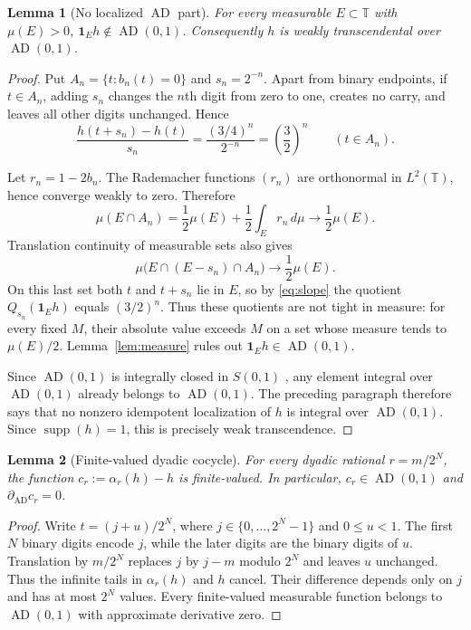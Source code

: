 \documentclass[11pt]{article}
\newtheorem{lemma}{Lemma}
\newcommand{\AD}{\operatorname{AD}}
\newcommand{\supp}{\operatorname{supp}}
\newcommand{\T}{\mathbb T}
\newcommand{\1}{\mathbf 1}
\begin{document}
\begin{lemma}[No localized $\AD$ part]\label{lem:weak}
For every measurable $E\subset\T$ with $\mu(E)>0$,
$\1_Eh\notin\AD(0,1)$.  Consequently $h$ is weakly transcendental over
$\AD(0,1)$.
\end{lemma}

\begin{proof}
Put $A_n=\{t:b_n(t)=0\}$ and $s_n=2^{-n}$.  Apart from binary endpoints,
if $t\in A_n$, adding $s_n$ changes the $n$th digit from zero to one, creates
no carry, and leaves all other digits unchanged.  Hence
\begin{equation}\label{eq:slope}
 \frac{h(t+s_n)-h(t)}{s_n}
 =\frac{(3/4)^n}{2^{-n}}=\left(\frac32\right)^n
 \qquad(t\in A_n).
\end{equation}

Let $r_n=1-2b_n$.  The Rademacher functions $(r_n)$ are orthonormal in
$L^2(\T)$, hence converge weakly to zero.  Therefore
\[
 \mu(E\cap A_n)
 =\frac12\mu(E)+\frac12\int_E r_n\,d\mu
 \longrightarrow \frac12\mu(E).
\]
Translation continuity of measurable sets also gives
\[
 \mu\bigl(E\cap(E-s_n)\cap A_n\bigr)
 \longrightarrow \frac12\mu(E).
\]
On this last set both $t$ and $t+s_n$ lie in $E$, so by
\eqref{eq:slope} the quotient $Q_{s_n}(\1_Eh)$ equals $(3/2)^n$.
Thus these quotients are not tight in measure: for every fixed $M$, their
absolute value exceeds $M$ on a set whose measure tends to $\mu(E)/2$.
Lemma~\ref{lem:measure} rules out $\1_Eh\in\AD(0,1)$.

Since $\AD(0,1)$ is integrally closed in $S(0,1)$ \cite{BKS}, any element
integral over $\AD(0,1)$ already belongs to $\AD(0,1)$.  The preceding
paragraph therefore says that no nonzero idempotent localization of $h$ is
integral over $\AD(0,1)$.  Since $\supp(h)=1$, this is precisely weak
transcendence.
\end{proof}

\begin{lemma}[Finite-valued dyadic cocycle]\label{lem:cocycle}
For every dyadic rational $r=m/2^N$, the function
$c_r:=\alpha_r(h)-h$ is finite-valued.  In particular,
$c_r\in\AD(0,1)$ and $\partial_{\!\AD}c_r=0$.
\end{lemma}

\begin{proof}
Write $t=(j+u)/2^N$, where $j\in\{0,\ldots,2^N-1\}$ and $0\leq u<1$.
The first $N$ binary digits encode $j$, while the later digits are the binary
digits of $u$.  Translation by $m/2^N$ replaces $j$ by $j-m$ modulo $2^N$
and leaves $u$ unchanged.  Thus the infinite tails in $\alpha_r(h)$ and $h$
cancel.  Their difference depends only on $j$ and has at most $2^N$ values.
Every finite-valued measurable function belongs to $\AD(0,1)$ with
approximate derivative zero.
\end{proof}
\end{document}
